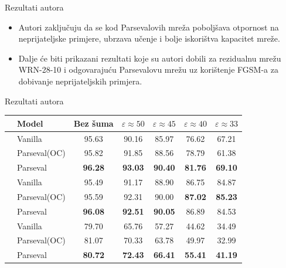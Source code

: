 \documentclass{beamer}
\begin{document}
\begin{frame}{Rezultati autora}
\begin{itemize}
	\item Autori zaključuju da se kod Parsevalovih mreža poboljšava otpornost na neprijateljske primjere, ubrzava učenje i bolje iskorištva kapacitet mreže.
	\item Dalje će biti prikazani rezultati koje su autori dobili za rezidualnu mrežu WRN-28-10 i odgovarajuću Parsevalovu mrežu uz korištenje FGSM-a za dobivanje neprijateljskih primjera.
\end{itemize}
\end{frame}

\begin{frame}{Rezultati autora}
\begin{table}[h!]
	\begin{center}
		\bgroup\footnotesize
		\begin{tabular}{|c|l|c|c|c|c|c|}
			\hline
			{\bf }
			& {\bf Model}
			& {\bf Bez šuma} & {\bf $\varepsilon\approx50$} & {\bf $\varepsilon\approx45$} & {\bf $\varepsilon\approx40$} & {\bf $\varepsilon\approx33$} \\
			\hline
			\multirow{6}{*}{\rotatebox{90}{CIFAR-10}}
			& Vanilla
			& 95.63         & 90.16         & 85.97         & 76.62         & 67.21      \\
			& Parseval(OC)
			& 95.82         & 91.85         & 88.56         & 78.79         & 61.38      \\
			& Parseval
			& \textbf{96.28}          & \textbf{93.03}         & \textbf{90.40}         & \textbf{81.76}         & \textbf{69.10}      \\
			\cline{2-7}
			\cline{2-7}
			& Vanilla
			& 95.49         & 91.17         & 88.90         & 86.75         & 84.87      \\
			& Parseval(OC)
			& 95.59         & 92.31         & 90.00         & \textbf{87.02}         & \textbf{85.23}      \\
			& Parseval
			& \textbf{96.08}          & \textbf{92.51}         & \textbf{90.05}         & 86.89         & 84.53      \\
			\hline\hline
			\multirow{6}{*}{\rotatebox{90}{CIFAR-100}}
			& Vanilla
			& 79.70         & 65.76         & 57.27         & 44.62         & 34.49      \\
			&Parseval(OC)
			& 81.07         & 70.33         & 63.78         & 49.97         & 32.99      \\
			& Parseval
			& \textbf{80.72}          & \textbf{72.43}         & \textbf{66.41}         & \textbf{55.41}         & \textbf{41.19}      \\

\end{tabular}
\end{center}
\end{table}
\end{frame}
\end{document}
